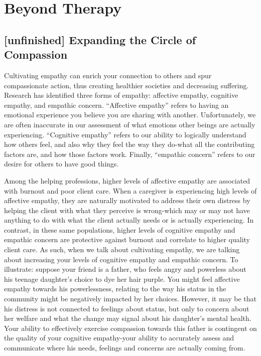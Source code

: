 \documentclass[12pt,letterpaper]{book}
\begin{document}
\chapter{Beyond Therapy}
\section{[unfinished] Expanding the Circle of Compassion}
\label{sec:circle}
Cultivating empathy can enrich your connection to others and spur compassionate action, thus creating healthier societies and decreasing suffering. Research has identified three forms of empathy: affective empathy, cognitive empathy, and empathic concern. “Affective empathy” refers to having an emotional experience you believe you are sharing with another. Unfortunately, we are often inaccurate in our assessment of what emotions other beings are actually experiencing. “Cognitive empathy” refers to our ability to logically understand how others feel, and also why they feel the way they do-what all the contributing factors are, and how those factors work. Finally, “empathic concern” refers to our desire for others to have good things.

Among the helping professions, higher levels of affective empathy are associated with burnout and poor client care. When a caregiver is experiencing high levels of affective empathy, they are naturally motivated to address their own distress by helping the client with what they perceive is wrong-which may or may not have anything to do with what the client actually needs or is actually experiencing. In contrast, in these same populations, higher levels of cognitive empathy and empathic concern are protective against burnout and correlate to higher quality client care. As such, when we talk about cultivating empathy, we are talking about increasing your levels of cognitive empathy and empathic concern. To illustrate: suppose your friend is a father, who feels angry and powerless about his teenage daughter's choice to dye her hair purple. You might feel affective empathy towards his powerlessness, relating to the way his status in the community might be negatively impacted by her choices. However, it may be that his distress is not connected to feelings about status, but only to concern about her welfare and what the change may signal about his daughter's mental health. Your ability to effectively exercise compassion towards this father is contingent on the quality of your cognitive empathy-your ability to accurately assess and communicate where his needs, feelings and concerns are actually coming from.
\end{document}
